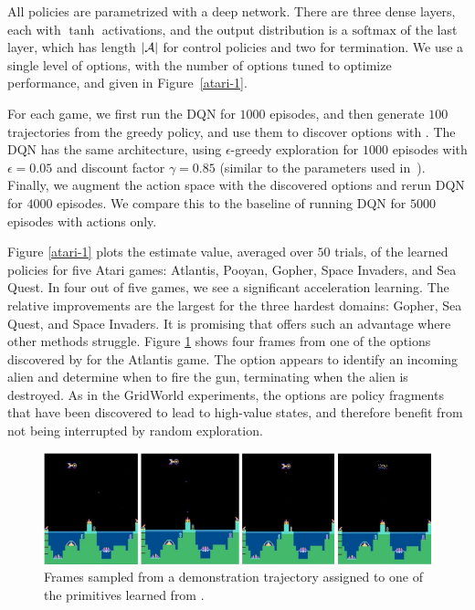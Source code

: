 All policies are parametrized with a deep network. There are three dense layers, each with $\tanh$ activations, and the output distribution is a $\mathrm{softmax}$ of the last layer, which has length $|\mathcal{A}|$ for control policies and two for termination. We use a single level of options, with the number of options tuned to optimize performance, and given in Figure~\ref{atari-1}.

For each game, we first run the DQN for $1000$ episodes, and then generate $100$ trajectories from the greedy policy, and use them to discover options with \alg.
The DQN has the same architecture, using $\epsilon$-greedy exploration for $1000$ episodes with $\epsilon=0.05$ and discount factor $\gamma=0.85$ (similar to the parameters used in~\citep{sygnowski2016learning}). 
Finally, we augment the action space with the discovered options and rerun DQN for $4000$ episodes. 
We compare this to the baseline of running DQN for $5000$ episodes with actions only.

Figure \ref{atari-1} plots the estimate value, averaged over $50$ trials, of the learned policies for five Atari games: Atlantis, Pooyan, Gopher, Space Invaders, and Sea Quest.
In four out of five games, we see a significant acceleration learning.
The relative improvements are the largest for the three hardest domains: Gopher, Sea Quest, and Space Invaders.
It is promising that \alg offers such an advantage where other methods struggle. 
Figure \ref{atari-3} shows four frames from one of the options discovered by \alg for the Atlantis game. %
The option appears to identify an incoming alien and determine when to fire the gun, terminating when the alien is destroyed.
As in the GridWorld experiments, the options are policy fragments that have been discovered to lead to high-value states, and therefore benefit from not being interrupted by random exploration.

\begin{figure}[ht!]
    \centering
    \includegraphics[width=\columnwidth]{ddco-experiments/atlantis-primitive.png}
    \caption{Frames sampled from a demonstration trajectory assigned to one of the primitives learned from \alg.  \label{atari-3}}
\end{figure}


